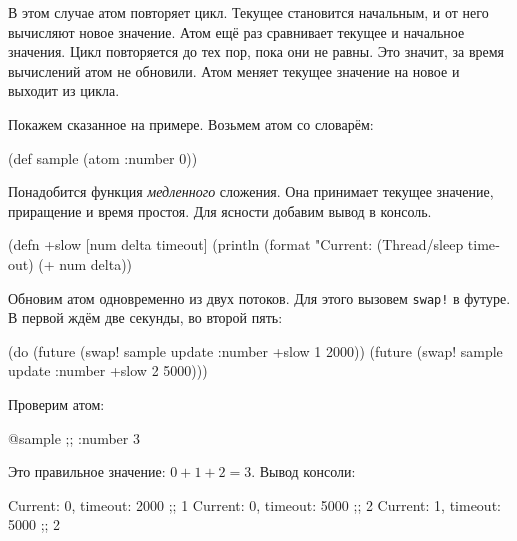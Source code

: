 В этом случае атом повторяет цикл. Текущее становится начальным, и от него
вычисляют новое значение. Атом ещё раз сравнивает текущее и начальное
значения. Цикл повторяется до тех пор, пока они не равны. Это значит, за время
вычислений атом не обновили. Атом меняет текущее значение на новое и выходит из
цикла.

Покажем сказанное на примере. Возьмем атом со словарём:

\begin{english}
  \begin{clojure}
(def sample (atom {:number 0}))
  \end{clojure}
\end{english}

Понадобится функция \emph{медленного} сложения. Она принимает текущее значение,
приращение и время простоя. Для ясности добавим вывод в консоль.

\begin{english}
  \begin{clojure}
(defn +slow
  [num delta timeout]
  (println (format "Current: %
  (Thread/sleep timeout)
  (+ num delta))
  \end{clojure}
\end{english}


Обновим атом одновременно из двух потоков. Для этого вызовем \verb|swap!| в
футуре. В первой ждём две секунды, во второй пять:

\begin{english}
  \begin{clojure}
(do (future (swap! sample update :number +slow 1 2000))
    (future (swap! sample update :number +slow 2 5000)))
  \end{clojure}
\end{english}

\noindent
Проверим атом:

\begin{english}
  \begin{clojure}
@sample ;; {:number 3}
  \end{clojure}
\end{english}

\noindent
Это правильное значение: $0 + 1 + 2 = 3$. Вывод консоли:

\begin{english}
  \begin{text}
Current: 0, timeout: 2000 ;; 1
Current: 0, timeout: 5000 ;; 2
Current: 1, timeout: 5000 ;; 2
  \end{text}
\end{english}


